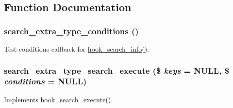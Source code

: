 \subsection{Function Documentation}
\hypertarget{search__extra__type_8module_a07a5626108879a6b58aed84710846928}{
\subsubsection[{search\_\-extra\_\-type\_\-conditions}]{\setlength{\rightskip}{0pt plus 5cm}search\_\-extra\_\-type\_\-conditions ()}}
\label{search__extra__type_8module_a07a5626108879a6b58aed84710846928}
Test conditions callback for \hyperlink{group__search_ga37b761616f2cad4796891008f2b374f3}{hook\_\-search\_\-info()}. \hypertarget{search__extra__type_8module_a947838e02dba6b772e681d2808ab6001}{
\subsubsection[{search\_\-extra\_\-type\_\-search\_\-execute}]{\setlength{\rightskip}{0pt plus 5cm}search\_\-extra\_\-type\_\-search\_\-execute (\$ {\em keys} = {\ttfamily NULL}, \/  \$ {\em conditions} = {\ttfamily NULL})}}
\label{search__extra__type_8module_a947838e02dba6b772e681d2808ab6001}
Implements \hyperlink{group__search_ga00be3e4a3b64ad73f8ad1304a450cee5}{hook\_\-search\_\-execute()}.

